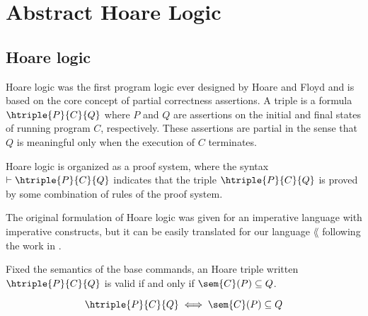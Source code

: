 \section{Abstract Hoare Logic}
\label{chp:intro-ahorare}

\subsection{Hoare logic}
Hoare logic was the first program logic ever designed by Hoare and Floyd 
\cite{Hoare69, Floyd93} and is based on the core concept of partial correctness 
assertions. A triple is a formula $\htriple{P}{C}{Q}$ where $P$ and $Q$ are 
assertions on the initial and final states of running program $C$, respectively. 
These assertions are partial in the sense that $Q$ is meaningful only when the 
execution of $C$ terminates.

Hoare logic is organized as a proof system, where the syntax 
$\vdash \htriple{P}{C}{Q}$ indicates that the triple 
$\htriple{P}{C}{Q}$ is proved by some combination of rules of the proof system.

The original formulation of Hoare logic was given for an imperative language 
with imperative constructs, but it can be easily translated for our language 
$\lang$ following the work in \cite{Moller21}.

\begin{definition}
  \label{def:hoare}
  Fixed the semantics of the base commands, an Hoare triple written 
  $\htriple{P}{C}{Q}$ is valid if and only if $\sem{C}(P) \subseteq Q$.

  $$\htriple{P}{C}{Q} \iff \sem{C}(P) \subseteq Q$$
\end{definition}

